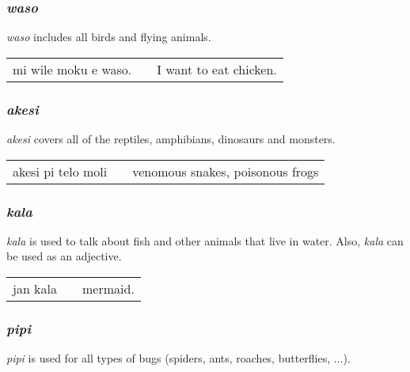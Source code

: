 \subsubsection*{\textit{waso}}
%
\textit{waso} includes all birds and flying animals. 

\begin{supertabular}{p{5,5cm}|ll}
mi wile moku e waso. && I want to eat chicken. \\
\end{supertabular} 
%
%
\subsubsection*{\textit{akesi}}
%
\textit{akesi} covers all of the reptiles, amphibians, dinosaurs and monsters.

\begin{supertabular}{p{5,5cm}|ll}
akesi pi telo moli && venomous snakes, poisonous frogs \\
\end{supertabular} 
%
\subsubsection*{\textit{kala}}
%
\textit{kala} is used to talk about fish and other animals that live in water. 
Also, \textit{kala} can be used as an adjective. 

\begin{supertabular}{p{5,5cm}|ll}
jan kala && mermaid. \\
\end{supertabular} 
%
\subsubsection*{\textit{pipi}}
%
\textit{pipi} is used for all types of bugs (spiders, ants, roaches, butterflies, ...). 
%
{}
